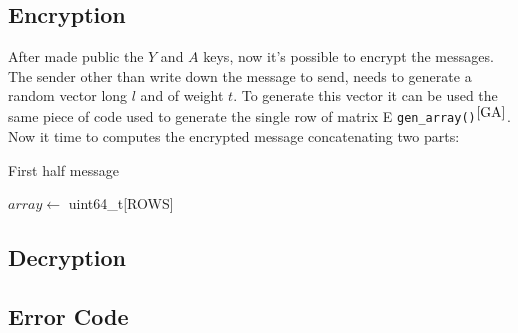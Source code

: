 \subsection{Encryption}
After made public the $Y$ and $A$ keys, now it's possible to encrypt the messages. The sender other than write down the message to send, needs to generate a random vector long $l$ and of weight $t$.
To generate this vector it can be used the same piece of code used to generate the single row of matrix E \texttt{gen\_array()}$^{\ref{GA}}$. Now it time to computes the encrypted message concatenating two parts:
\begin{algorithm}
\DontPrintSemicolon
\caption{First half message}\label{FH}
$array \leftarrow$ uint64\_t[ROWS]\;
\end{algorithm}

\subsection{Decryption}
\subsection{Error Code}
